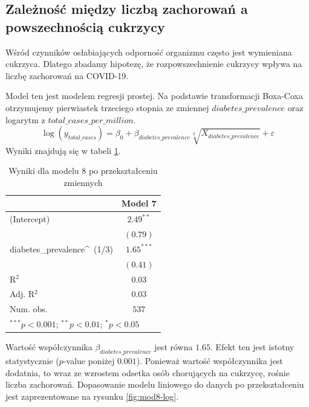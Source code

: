\documentclass[12pt]{mwbk}
\theoremstyle{plain}
\theoremstyle{definition}
\theoremstyle{definition}
\begin{document}
\subsection{Zależność między liczbą zachorowań a powszechnością cukrzycy}

Wśród czynników osłabiających odporność organizmu często jest wymieniana cukrzyca. Dlatego zbadamy hipotezę, że rozpowszechnienie cukrzycy wpływa na liczbę zachorowań na COVID-19.

Model ten jest modelem regresji prostej. Na podstawie transformacji Boxa-Coxa otrzymujemy pierwiastek trzeciego stopnia ze zmiennej $diabetes\_prevalence$ oraz logarytm z $total\_cases\_per\_million$.
$$\log(y_{total\_cases})=\beta_0+\beta_{diabetes\_prevalence}\sqrt[3]{X_{diabetes\_prevalence}}+\varepsilon$$
Wyniki znajdują się w tabeli \ref{table:mod8-log}.

\begin{table}[htbp]
	\begin{center}
		\begin{tabular}{l c}
			\hline
			& Model 7 \\
			\hline
			(Intercept)                & $2.49^{**}$  \\
			& $(0.79)$     \\
			diabetes\_prevalence\^~(1/3) & $1.65^{***}$ \\
			& $(0.41)$     \\
			\hline
			R$^2$                      & $0.03$       \\
			Adj. R$^2$                 & $0.03$       \\
			Num. obs.                  & $537$        \\
			\hline
			\multicolumn{2}{l}{\scriptsize{$^{***}p<0.001$; $^{**}p<0.01$; $^{*}p<0.05$}}
		\end{tabular}
		\caption{Wyniki dla modelu 8 po przekształceniu zmiennych}
		\label{table:mod8-log}
	\end{center}
\end{table}

Wartość współczynnika $\beta_{diabetes\_prevalence}$ jest równa $1.65$. Efekt ten jest istotny statystycznie ($p$-value poniżej $0.001$). Ponieważ wartość współczynnika jest dodatnia, to wraz ze wzrostem odsetka osób chorujących na cukrzycę, rośnie liczba zachorowań. Dopasowanie modelu liniowego do danych po przekształceniu jest zaprezentowane na rysunku \ref{fig:mod8-log}.
\end{document}
